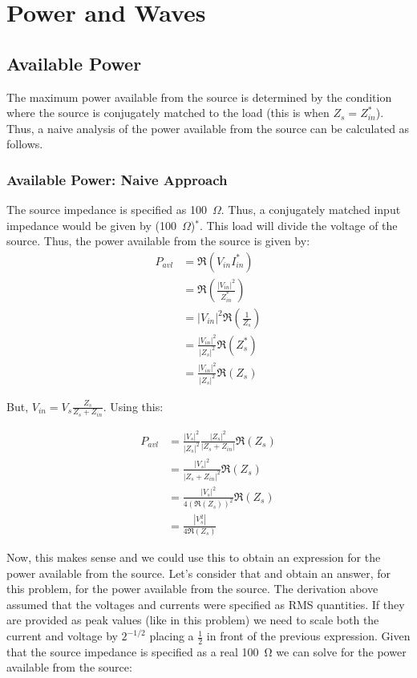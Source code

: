 \section{Power and Waves}
\subsection{Available Power}
The maximum power available from the source is determined by the condition where
the source is conjugately matched to the load (this is when $Z_s = Z_{in}^*$).
Thus, a naive analysis of the power available from the source can be calculated
as follows.

\subsubsection{Available Power: Naive Approach}
The source impedance is specified as 100~$\Omega$. Thus, a conjugately matched
input impedance would be given by (100~$\Omega$)$^*$. This load will divide the
voltage of the source. Thus, the power available
from the source is given by:
\begin{align*}
    P_{avl} &= \Re(V_{in}I_{in}^*) \\
            &= \Re \left(\frac{|V_{in}|^2}{Z_{in}^*}\right) \\
            &= \left| V_{in} \right|^2 \Re \left( \frac{1}{Z_s} \right) \\
            &= \frac{\left| V_{in} \right|^2}{|Z_s|^2} \Re \left( Z_s^* \right) \\
            &= \frac{\left| V_{in} \right|^2}{|Z_s|^2} \Re \left( Z_s \right)
\end{align*}

But, $V_{in} = V_s \frac{Z_s}{Z_s+Z_{in}}$. Using this:

\begin{align*}
    P_{avl} &= \frac{\left| V_s \right|^2}{\left| Z_s \right|^2} \frac{\left|
Z_s\right|^2}{\left| Z_s + Z_{in}\right|} \Re \left( Z_s \right) \\
&=\frac{\left| V_s \right|^2}{\left| Z_s + Z_{in} \right|^2} \Re \left( Z_s
\right) \\
&= \frac{\left| V_s \right|^2}{4 \left( \Re \left( Z_s \right) \right)^2} \Re
\left( Z_s \right) \\
&= \frac{\left| V_s^2 \right|}{4 \Re \left( Z_s \right)}
\end{align*}

Now, this makes sense and we could use this to obtain an expression for the
power available from the source. Let's consider that and obtain an answer, for
this problem, for the power available from the source. The derivation above
assumed that the voltages and currents were specified as RMS quantities. If they
are provided as peak values (like in this problem) we need to scale both the
current and voltage by $2^{-1/2}$ placing a $\frac{1}{2}$ in front of the
previous expression. Given that the source impedance is specified as a real
\SI{100}{\ohm} we can solve for the power available from the source:


